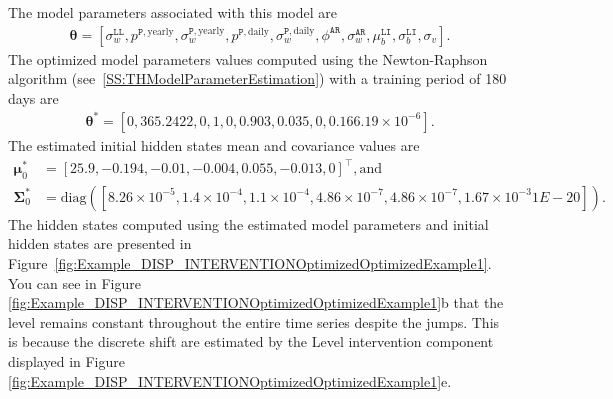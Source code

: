 The model parameters associated with this model are
\begin{gather*}
\bm\theta=[\sigma_{w}^{\mathtt{LL}}, p^{\mathtt{P}, \text{yearly}}, \sigma_{w}^{\mathtt{P}, \text{yearly}} , p^{\mathtt{P}, \text{daily}}, \sigma_{w}^{\mathtt{P}, \text{daily}}, \phi^{\mathtt{AR}}, \sigma_{w}^{\mathtt{AR}}, \mu_{b}^{\mathtt{LI}}, \sigma_{b}^{\mathtt{LI}}, \sigma_{v}].
\end{gather*}
The optimized model parameters values computed using the Newton-Raphson algorithm (see~\ref{SS:THModelParameterEstimation}) with a training period of 180 days  are
\begin{gather*}
\bm\theta^{\text{*}}=[0, 365.2422, 0, 1, 0, 0.903, 0.035, 0, 0.16 6.19\times10^{-6} ].
\end{gather*}
The estimated initial hidden states mean and covariance values are 
\begin{align*}
\bm \mu^{*}_{0} & = [	25.9,-0.194,-0.01	,-0.004,0.055,-0.013,0]^{\intercal}, \text{and} \\
\bm\Sigma^{*}_{0} & = \text{diag}([8.26\times10^{-5},	1.4\times10^{-4},	1.1\times10^{-4},	4.86\times10^{-7},	4.86\times10^{-7},	1.67\times10^{-3}  1E-20 ]).
 \end{align*}
The hidden states computed using the estimated model parameters and initial hidden states are presented in Figure~\ref{fig:Example_DISP_INTERVENTIONOptimizedOptimizedExample1}. You can see in Figure \ref{fig:Example_DISP_INTERVENTIONOptimizedOptimizedExample1}b that the level remains constant throughout the entire time series despite the jumps. This is because the discrete shift are estimated by the Level intervention component displayed in Figure \ref{fig:Example_DISP_INTERVENTIONOptimizedOptimizedExample1}e. 


